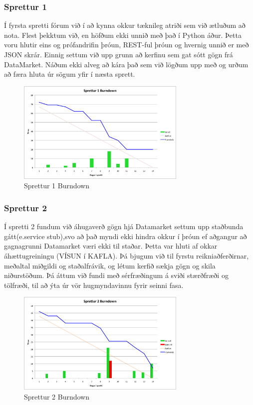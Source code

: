 \documentclass{article}
\begin{document}
\subsubsection{Sprettur 1}
Í fyrsta spretti fórum við í að kynna okkur tæknileg atriði sem við ætluðum að
nota.
Flest þekktum við, en höfðum ekki unnið með það í Python áður. Þetta voru hlutir
eins og prófandrifin þróun, REST-ful þróun og hvernig 
unnið er með JSON skrár. Einnig settum við upp grunn að kerfinu sem gat sótt
gögn frá DataMarket. Náðum ekki alveg að kára það sem við lögðum 
upp með og urðum að færa hluta úr sögum yfir í næsta sprett.
\begin{figure}[H]
  \centering
  \includegraphics[width=0.72\textwidth]{Sprettur1_Burndown.png}
  \caption{Sprettur 1 Burndown}
\end{figure}

\subsubsection{Sprettur 2}
Í spretti 2 fundum við áhugaverð gögn hjá Datamarket settum upp staðbunda
gátt(e.service stub),svo að það myndi ekki hindra okkur í þróun ef 
aðgangur að gagnagrunni Datamarket væri ekki til staðar. Þetta var hluti af
okkar áhættugreiningu (VÍSUN í KAFLA). 
Þá bjugum við til fyrstu reikniaðferðirnar, meðaltal miðgildi og staðalfrávik,
og létum kerfið sækja gögn og skila niðurstöðum.
Þá áttum við fundi með sérfræðingum á sviði stærðfræði og tölfræði, til að ýta
úr vör hugmyndavinnu fyrir seinni fasa.
\begin{figure}[H]
 \centering
 \includegraphics[width=0.72\textwidth]{Sprettur2_Burndown.png}
 \caption{Sprettur 2 Burndown}
\end{figure}
\end{document}
